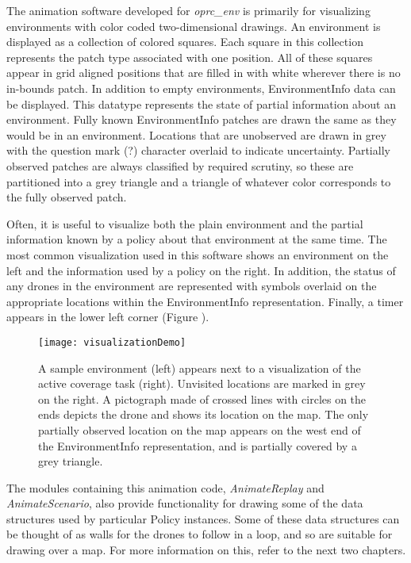 The animation software developed for \textit{oprc\_env} is primarily for visualizing environments with color coded two-dimensional drawings. An environment is displayed as a collection of colored squares. Each square in this collection represents the patch type associated with one position. All of these squares appear in grid aligned positions that are filled in with white wherever there is no in-bounds patch. In addition to empty environments, EnvironmentInfo data can be displayed. This datatype represents the state of partial information about an environment. Fully known EnvironmentInfo patches are drawn the same as they would be in an environment. Locations that are unobserved are drawn in grey with the question mark (?) character overlaid to indicate uncertainty. Partially observed patches are always classified by required scrutiny, so these are partitioned into a grey triangle and a triangle of whatever color corresponds to the fully observed patch.

Often, it is useful to visualize both the plain environment and the partial information known by a policy about that environment at the same time. The most common visualization used in this software shows an environment on the left and the information used by a policy on the right. In addition, the status of any drones in the environment are represented with symbols overlaid on the appropriate locations within the EnvironmentInfo representation. Finally, a timer appears in the lower left corner (Figure ).

\begin{figure}[H]
\texttt{[image: visualizationDemo]}
\caption[Visualization of a Small Environment During Coverage]{A sample environment (left) appears next to a visualization of the active coverage task (right). Unvisited locations are marked in grey on the right. A pictograph made of crossed lines with circles on the ends depicts the drone and shows its location on the map. The only partially observed location on the map appears on the west end of the EnvironmentInfo representation, and is partially covered by a grey triangle.}
\label {fig:VizDemo}
\end{figure}

The modules containing this animation code, \textit{AnimateReplay} and \textit{AnimateScenario}, also provide functionality for drawing some of the data structures used by particular Policy instances. Some of these data structures can be thought of as walls for the drones to follow in a loop, and so are suitable for drawing over a map. For more information on this, refer to the next two chapters.

